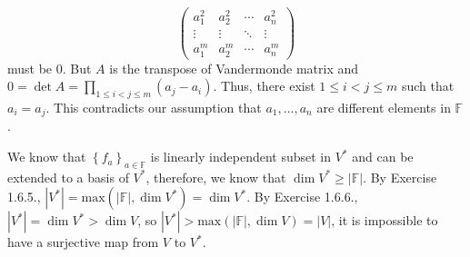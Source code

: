 \documentclass[a4paper, 12pt]{article}
\begin{document}
\begin{solution}
\begin{claimproof}
\[\begin{pmatrix}
	a_1^2 & a_2^2 & \cdots & a_n^2\\ 
	\vdots & \vdots & \ddots & \vdots \\ 
	a_1^m & a_2^m & \cdots & a_n^m
\end{pmatrix}\]
must be \(0\). But \(A\) is the transpose of Vandermonde matrix and \(0=\det A=\prod_{1\leq i<j\leq m}(a_j-a_i)\). Thus, there exist \(1\leq i<j\leq m \) such that \(a_i=a_j\). This contradicts our assumption 
that \(a_1,\ldots,a_n\) are different elements in \(\mathbb{F}\).
\end{claimproof}
We know that \(\left\{ f_a \right\}_{a\in \mathbb{F}}\) is linearly independent subset in \(V^*\) and can be extended to a basis of \(V^*\), therefore, we know that \(\dim V^*\geq |\mathbb{F}|\). By Exercise 1.6.5., 
\(|V^*|=\text{max}(|\mathbb{F}|,\dim V^*)=\dim V^*\). By Exercise 1.6.6., \(|V^*|=\dim V^*>\dim V\), so \(|V^*|>\text{max}(|\mathbb{F}|,\dim V)=|V|\), it is impossible to have a surjective map from \(V\) to \(V^*\).
\end{solution}
\end{document}
